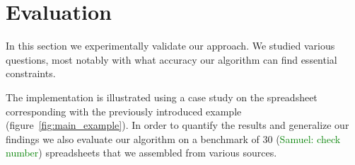 \documentclass{ecai}
\newcommand{\sergey}[1]{\textcolor{magenta}{{\sc Sergey:} #1}\xspace}
\newcommand{\samuel}[1]{\textcolor{green}{{\sc Samuel:} #1}\xspace}
\newcommand{\constraints}{\ensuremath{\mathcal{C}}\xspace}
\newcommand{\format}[1]{\textit{#1}\xspace}
\newcommand{\extractgroups}{\format{extractGroups}}
\newcommand{\extracttables}{\format{extractTables}}
\newcommand{\learnconstraints}{\format{learnConstraints}}
\newcommand{\dependencies}{\ensuremath{\mathcal{D}}\xspace}
\begin{document}



\section{Evaluation}
In this section we experimentally validate our approach.
We studied various questions, most notably with what accuracy our algorithm can find essential constraints.

The implementation is illustrated using a case study on the spreadsheet corresponding with the previously introduced example (figure~\ref{fig:main_example}).
In order to quantify the results and generalize our findings we also evaluate our algorithm on a benchmark of 30 (\samuel{check number}) spreadsheets that we assembled from various sources.
\end{document}
